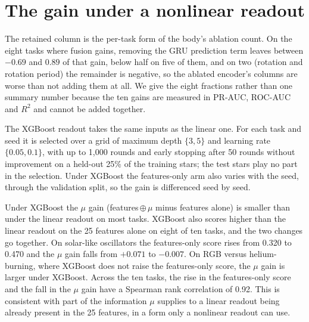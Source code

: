\documentclass{article}
\begin{document}
\section{The gain under a nonlinear readout}
\label{app:readout}

\begin{table}[H]
\caption{What 128 added columns change, relative to the 25 features alone, under each frozen readout
(mean over six encoder seeds; absolute scores are in Table~\ref{tab:scorecard}). $+\mu$: our encoder.
No prediction term: the same recipe trained without the GRU prediction term. Retained: the share of
the full $\mu$ gain that survives that removal, printed only where the full gain is a gain, and
negative where the gain changes sign rather than shrinking. Untrained: a randomly
initialised encoder, which is a single encoder and carries no band. Bold: beyond $2\,\mathrm{SE}$. The
last row counts tasks won, tied and lost at that bar.}
\label{tab:readout}
\centering
\scriptsize

\end{table}

The retained column is the per-task form of the body's ablation count. On the eight tasks where
fusion gains, removing the GRU prediction term leaves between $-0.69$ and $0.89$ of that gain, below
half on five of them, and on two (rotation and rotation period) the remainder is negative, so the
ablated encoder's columns are worse than not adding them at all. We give the eight fractions rather
than one summary number because the ten gains are measured in PR-AUC, ROC-AUC and $R^{2}$ and cannot
be added together.

The XGBoost readout takes the same inputs as the linear one. For each task and seed it is selected
over a grid of maximum depth $\{3,5\}$ and learning rate $\{0.05,0.1\}$, with up to 1{,}000 rounds
and early stopping after 50 rounds without improvement on a held-out 25\% of the training stars;
the test stars play no part in the selection. Under XGBoost the features-only arm also varies with
the seed, through the validation split, so the gain is differenced seed by seed.

Under XGBoost the $\mu$ gain (features\,$\oplus\,\mu$ minus features alone) is smaller than under the
linear readout on most tasks. XGBoost also scores higher than the linear readout on the 25 features
alone on eight of ten tasks, and the two changes go together. On solar-like oscillators the features-only score rises from
0.320 to 0.470 and the $\mu$ gain falls from $+0.071$ to $-0.007$. On RGB versus helium-burning,
where XGBoost does not raise the features-only score, the $\mu$ gain is larger under XGBoost. Across
the ten tasks, the rise in the features-only score and the fall in the $\mu$ gain have a Spearman rank
correlation of 0.92. This is consistent with part of the information $\mu$ supplies to a linear
readout being already present in the 25 features, in a form only a nonlinear readout can use.
\end{document}
